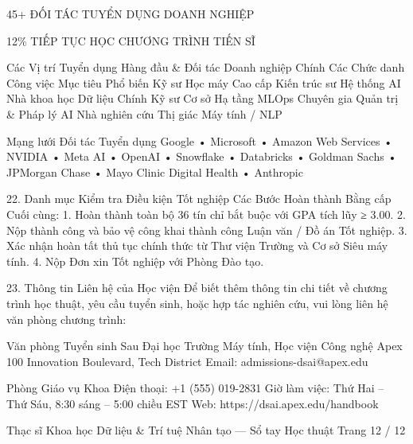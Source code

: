 45+
ĐỐI TÁC TUYỂN DỤNG DOANH NGHIỆP

12\%
TIẾP TỤC HỌC CHƯƠNG TRÌNH TIẾN SĨ

Các Vị trí Tuyển dụng Hàng đầu \& Đối tác Doanh nghiệp Chính
Các Chức danh Công việc Mục tiêu Phổ biến
Kỹ sư Học máy Cao cấp
Kiến trúc sư Hệ thống AI
Nhà khoa học Dữ liệu Chính
Kỹ sư Cơ sở Hạ tầng MLOps
Chuyên gia Quản trị \& Pháp lý AI
Nhà nghiên cứu Thị giác Máy tính / NLP

Mạng lưới Đối tác Tuyển dụng
Google • Microsoft • Amazon Web Services • NVIDIA • Meta AI • OpenAI • Snowflake • Databricks • Goldman Sachs • JPMorgan Chase • Mayo Clinic Digital Health • Anthropic

22. Danh mục Kiểm tra Điều kiện Tốt nghiệp
Các Bước Hoàn thành Bằng cấp Cuối cùng:
1. Hoàn thành toàn bộ 36 tín chỉ bắt buộc với GPA tích lũy ≥ 3.00.
2. Nộp thành công và bảo vệ công khai thành công Luận văn / Đồ án Tốt nghiệp.
3. Xác nhận hoàn tất thủ tục chính thức từ Thư viện Trường và Cơ sở Siêu máy tính.
4. Nộp Đơn xin Tốt nghiệp với Phòng Đào tạo.

23. Thông tin Liên hệ của Học viện
Để biết thêm thông tin chi tiết về chương trình học thuật, yêu cầu tuyển sinh, hoặc hợp tác nghiên cứu, vui lòng liên hệ văn phòng chương trình:

Văn phòng Tuyển sinh Sau Đại học
Trường Máy tính, Học viện Công nghệ Apex
100 Innovation Boulevard, Tech District
Email: admissions-dsai@apex.edu

Phòng Giáo vụ Khoa
Điện thoại: +1 (555) 019-2831
Giờ làm việc: Thứ Hai – Thứ Sáu, 8:30 sáng – 5:00 chiều EST
Web: https://dsai.apex.edu/handbook

Thạc sĩ Khoa học Dữ liệu \& Trí tuệ Nhân tạo — Sổ tay Học thuật
Trang 12 / 12

